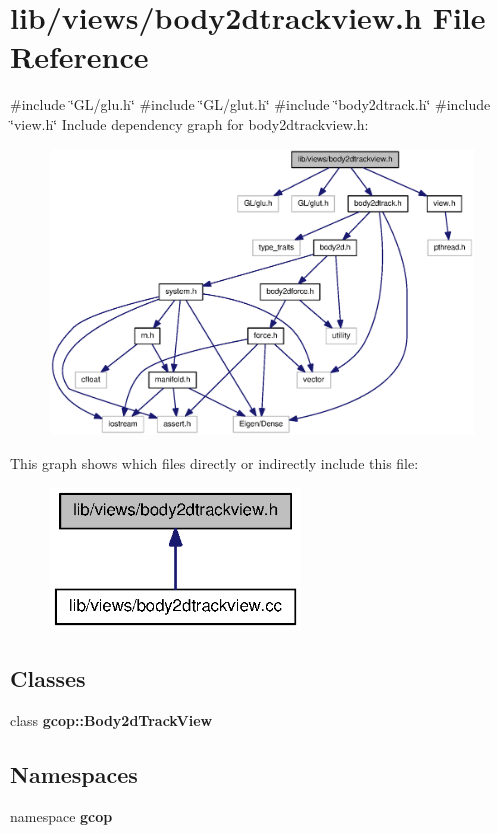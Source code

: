 \section{lib/views/body2dtrackview.h \-File \-Reference}
\label{body2dtrackview_8h}
{\ttfamily \#include \char`\"{}\-G\-L/glu.\-h\char`\"{}}\*
{\ttfamily \#include \char`\"{}\-G\-L/glut.\-h\char`\"{}}\*
{\ttfamily \#include \char`\"{}body2dtrack.\-h\char`\"{}}\*
{\ttfamily \#include \char`\"{}view.\-h\char`\"{}}\*
\-Include dependency graph for body2dtrackview.\-h\-:\nopagebreak
\begin{figure}[H]
\begin{center}
\leavevmode
\includegraphics[width=350pt]{body2dtrackview_8h__incl}
\end{center}
\end{figure}
\-This graph shows which files directly or indirectly include this file\-:\nopagebreak
\begin{figure}[H]
\begin{center}
\leavevmode
\includegraphics[width=188pt]{body2dtrackview_8h__dep__incl}
\end{center}
\end{figure}
\subsection*{\-Classes}
\begin{DoxyCompactItemize}
\item 
class {\bf gcop\-::\-Body2d\-Track\-View}
\end{DoxyCompactItemize}
\subsection*{\-Namespaces}
\begin{DoxyCompactItemize}
\item 
namespace {\bf gcop}
\end{DoxyCompactItemize}
